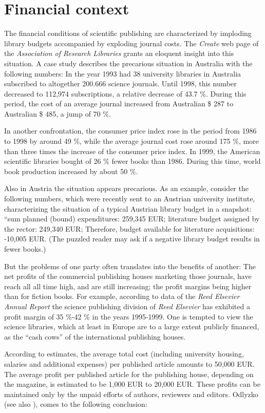 \section{Financial context}

The financial  conditions of scientific publishing are
characterized by imploding library budgets accompanied by exploding
journal costs.  The {\it Create} web page of the {\it Association of
Research Libraries} grants an eloquent insight into this situation.  A
case study describes the precarious situation in Australia with the
following numbers:  In the year 1993 had 38 university libraries in
Australia subscribed to altogether 200.666 science journals.  Until
1998, this number decreased to 112,974 subscriptions, a relative
decrease of 43.7 \%.  During this period, the cost of an average journal
increased from Australian \$ 287 to Australian \$ 485, a jump of 70 \%.

In another confrontation, the consumer price index rose in the period
from 1986 to 1998 by around 49 \%, while the average journal cost rose
around 175 \%, more than three times the increase of the consumer price
index.  In 1999, the American scientific libraries bought of 26 \% fewer
books than 1986.  During this time, world book production increased
by about 50 \%.

Also in Austria the situation appears precarious.  As an
example, consider the following numbers, which were recently sent to an Austrian
university institute, characterizing the situation of a typical Austrian
library budget in a snapshot:  ``sum planned (bound) expenditures:
259,345 EUR; literature budget assigned by the rector:  249,340 EUR;
Therefore, budget available for literature acquisitions:  -10,005 EUR.  (The
puzzled reader may ask if a negative library budget results in fewer
books.)

But the problems of one party often translates into the benefits of another:
The net profits of the commercial publishing houses marketing those
journals, have reach all all time high, and are still increasing; the profit
margins being higher than for fiction books.  For example, according to
data of the {\it Reed Elsevier Annual Report} the science publishing
division of {\it Reed Elsevier} has exhibited a profit margin of 35
\%-42 \% in the years 1995-1999.
One is tempted to view the science
libraries, which at least in Europe are to a large extent publicly
financed, as the ``cash cows'' of the international publishing houses.

According to estimates, the average total cost (including university housing,
salaries and additional expenses) per published article amounts to
50,000 EUR.  The average profit per published article for
the publishing house, depending on the magazine, is estimated to be
1,000 EUR to 20,000 EUR.  These profits can be maintained only by the
unpaid efforts of authors, reviewers and editors.  Odlyzko
\cite{1997-odlyzko} (see also \cite{1995-odlyzko}), comes to the
following conclusion:


